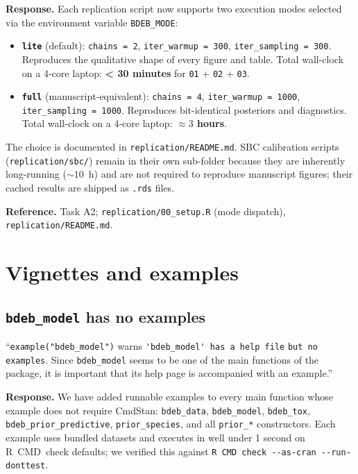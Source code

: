 \documentclass[11pt,a4paper]{article}
\newcommand{\code}[1]{\texttt{#1}}
\begin{document}
\textbf{Response.} Each replication script now supports two execution
modes selected via the environment variable \code{BDEB\_MODE}:

\begin{itemize}[nosep]
\item \textbf{\code{lite}} (default): \verb|chains = 2|,
  \verb|iter_warmup = 300|, \verb|iter_sampling = 300|. Reproduces
  the qualitative shape of every figure and table. Total wall-clock
  on a 4-core laptop: \textbf{< 30 minutes} for
  \code{01} + \code{02} + \code{03}.
\item \textbf{\code{full}} (manuscript-equivalent):
  \verb|chains = 4|, \verb|iter_warmup = 1000|,
  \verb|iter_sampling = 1000|. Reproduces bit-identical posteriors
  and diagnostics. Total wall-clock on a 4-core laptop:
  \textbf{$\approx 3$ hours}.
\end{itemize}

The choice is documented in \code{replication/README.md}. SBC
calibration scripts (\code{replication/sbc/}) remain in their own
sub-folder because they are inherently long-running ($\sim 10$~h) and
are not required to reproduce manuscript figures; their cached
results are shipped as \code{.rds} files.

\textbf{Reference.} Task A2; \code{replication/00\_setup.R} (mode
dispatch), \code{replication/README.md}.

\section{Vignettes and examples}

\subsection{\code{bdeb\_model} has no examples}

\begin{displayquote}
``\verb|example("bdeb_model")| warns
\verb|'bdeb_model' has a help file|\allowbreak{} \verb|but no examples|. Since
\code{bdeb\_model} seems to be one of the main functions of the
package, it is important that its help page is accompanied with an
example.''
\end{displayquote}

\textbf{Response.} We have added runnable examples to every main
function whose example does not require CmdStan: \code{bdeb\_data},
\code{bdeb\_model}, \code{bdeb\_tox}, \code{bdeb\_prior\_predictive},
\code{prior\_species}, and all \code{prior\_*} constructors. Each
example uses bundled datasets and executes in well under 1 second on
R~CMD~check defaults; we verified this against
\verb|R CMD check --as-cran --run-donttest|.
\end{document}
